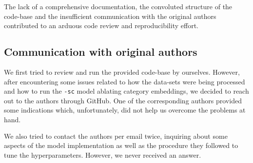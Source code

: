 The lack of a comprehensive documentation, the convoluted structure of the code-base and the insufficient
communication with the original authors contributed to an arduous code review and reproducibility effort.


\subsection{Communication with original authors}

We first tried to review and run the provided code-base by ourselves. However, after encountering some issues related to how the data-sets were being processed and how to run the \texttt{-sc} model ablating category embeddings, we decided to reach out to the authors through GitHub. One of the corresponding authors provided some indications which, unfortunately, did not help us overcome the problems at hand.

We also tried to contact the authors per email twice, inquiring about some aspects of the model implementation as well as the procedure they followed to tune the hyperparameters. However, we never received an answer.



